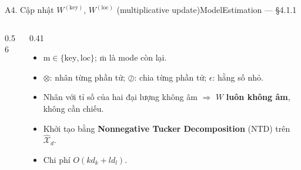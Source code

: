 \begin{frame}{A4. Cập nhật $W^{(\mathrm{key})}$, $W^{(\mathrm{loc})}$ (multiplicative update)}{ModelEstimation --- §4.1.1}
\begin{columns}[T,onlytextwidth]
\begin{column}{0.56\textwidth}
\begin{mathcard}
  \small
\end{mathcard}
\vspace{1mm}
\begin{mathcard}
  \small
\end{mathcard}
\end{column}
\begin{column}{0.41\textwidth}
\small
\begin{itemize}
  \item $\mathrm m\in\{\mathrm{key},\mathrm{loc}\}$; $\bar{\mathrm m}$ là mode còn lại.
  \item $\otimes$: nhân từng phần tử; $\oslash$: chia từng phần tử; $\epsilon$: hằng số nhỏ.
  \item Nhân với tỉ số của hai đại lượng không âm $\Rightarrow$ $W$ \textbf{luôn không âm}, không cần chiếu.
  \item Khởi tạo bằng \textbf{Nonnegative Tucker Decomposition} (NTD) trên $\widehat{\mathcal X}_d$.
  \item Chi phí $O(k d_k + l d_l)$.
\end{itemize}
\end{column}
\end{columns}
\vfill
{}
\end{frame}

